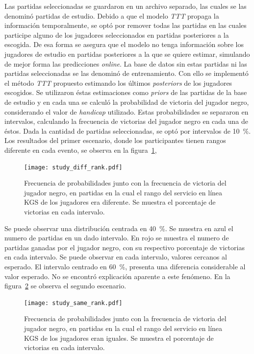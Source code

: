 \documentclass[11pt,twoside,spanish]{report} %
\begin{document}
Las partidas seleccionadas se guardaron en un archivo separado, las cuales se las denomin\'o  partidas de estudio.
Debido a que el modelo \textit{TTT} propaga la informaci\'on temporalmente, se opt\'o por remover todas las partidas en las cuales participe alguno de los jugadores seleccionados en partidas posteriores a la escogida.
De esa forma se asegura que el modelo no tenga informaci\'on sobre los jugadores de estudio en partidas posteriores a la que se quiere estimar, simulando de mejor forma las predicciones \textit{online}.
La base de datos sin estas partidas ni las partidas seleccionadas se las denomin\'o de entrenamiento.
Con ello se implement\'o el m\'etodo \textit{TTT} propuesto estimando los \'ultimos \textit{posteriors} de los jugadores escogidos.
Se utilizaron \'estas estimaciones como \textit{priors} de las partidas de la base de estudio y en cada una se calcul\'o la probabilidad de victoria del jugador negro, considerando el valor de \textit{handicap} utilizado.
Estas probabilidades se separaron en intervalos, calculando la frecuencia de victorias del jugador negro en cada una de \'estos.
Dada la cantidad de partidas seleccionadas, se opt\'o por intervalos de \SI{10}{\percent}.
Los resultados del primer escenario, donde los participantes tienen rangos diferente en cada evento, se observa en la figura~\ref{fig:diffRank}, 

\begin{figure}[H]
    \centering
    \texttt{[image: study\_diff\_rank.pdf]}
    \caption{Frecuencia de probabilidades junto con la frecuencia de victoria del jugador negro, en partidas en la cual el rango del servicio en l\'inea KGS de los jugadores era diferente. Se muestra el porcentaje de victorias en cada intervalo.}
    \label{fig:diffRank}
\end{figure}

Se puede observar una distribuci\'on centrada en  \SI{40}{\percent}. 
Se muestra en azul el numero de partidas en un dado intervalo.
En rojo se muestra el numero de partidas ganadas por el jugador negro, con su respectivo porcentaje de victorias en cada intervalo.
Se puede observar en cada intervalo, valores cercanos al esperado.
El intervalo centrado en \SI{60}{\percent}, presenta una diferencia considerable al valor esperado.
No se encontr\'o explicaci\'on aparente a este fen\'omeno.
En la figura~\ref{fig:sameRank} se observa el segundo escenario.


\begin{figure}[H]
    \centering
    \texttt{[image: study\_same\_rank.pdf]}
    \caption{Frecuencia de probabilidades junto con la frecuencia de victoria del jugador negro, en partidas en la cual el rango del servicio en l\'inea KGS de los jugadores eran iguales. Se muestra el porcentaje de victorias en cada intervalo.}
    \label{fig:sameRank}
\end{figure}
\end{document}
